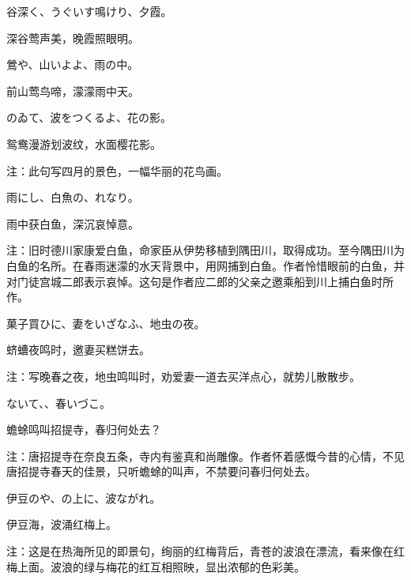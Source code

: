 \begin{haiku}
    {\FH 谷深く、うぐいす鳴けり、夕霞。}

    {\FK 深谷莺声美，晚霞照眼明。}
\end{haiku}

\begin{haiku}
    {\FH 鶯や、山いよよ、雨の中。}

    {\FK 前山莺鸟啼，濛濛雨中天。}
\end{haiku}

\begin{haiku}
    {\FH {}のゐて、波をつくるよ、花の影。}

    {\FK 鸳鸯漫游划波纹，水面樱花影。}

    {\FT 注：此句写四月的景色，一幅华丽的花鸟画。}
\end{haiku}

\begin{haiku}
    {\FH 雨にし、白魚の、れなり。}

    {\FK 雨中获白鱼，深沉哀悼意。}

    {\FT 注：旧时德川家康爱白鱼，命家臣从伊势移植到隅田川，取得成功。至今隅田川为白鱼的名所。在春雨迷濛的水天背景中，用网捕到白鱼。作者怜惜眼前的白鱼，并对门徒宫城二郎表示哀悼。这句是作者应二郎的父亲之邀乘船到川上捕白鱼时所作。}
\end{haiku}

\begin{haiku}
    {\FH 菓子買ひに、妻をいざなふ、地虫の夜。}

    {\FK 蛴螬夜鸣时，邀妻买糕饼去。}

    {\FT 注：写晚春之夜，地虫鸣叫时，劝爱妻一道去买洋点心，就势儿散散步。}
\end{haiku}

\begin{haiku}
    {\FH {}ないて、、春いづこ。}

    {\FK 蟾蜍鸣叫招提寺，春归何处去？}

    {\FT 注：唐招提寺在奈良五条，寺内有鉴真和尚雕像。作者怀着感慨今昔的心情，不见唐招提寺春天的佳景，只听蟾蜍的叫声，不禁要问春归何处去。}
\end{haiku}

\begin{haiku}
    {\FH 伊豆のや、の上に、波ながれ。}

    {\FK 伊豆海，波涌红梅上。}

    {\FT 注：这是在热海所见的即景句，绚丽的红梅背后，青苍的波浪在漂流，看来像在红梅上面。波浪的绿与梅花的红互相照映，显出浓郁的色彩美。}
\end{haiku}

